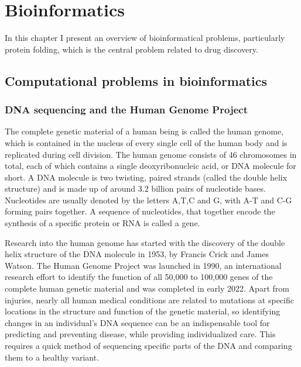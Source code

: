 \chapter{Bioinformatics}

In this chapter I present an overview of bioinformatical problems, particularly protein folding, which is the central problem related to drug discovery.\cite{BockenhauerAlgoBioinfo}

\section{Computational problems in bioinformatics}

\subsection{DNA sequencing and the Human Genome Project}

The complete genetic material of a human being is called the human genome, which is contained in the nucleus of every single cell of the human body and is replicated during cell division. The human genome consists of 46 chromosomes in total, each of which contains a single deoxyribonucleic acid, or DNA molecule for short. A DNA molecule is two twisting, paired strands (called the double helix structure) and is made up of around 3.2 billion pairs of nucleotide bases. Nucleotides are usually denoted by the letters A,T,C and G, with A-T and C-G forming pairs together. A sequence of nucleotides, that together encode the synthesis of a specific protein or RNA is called a gene.

Research into the human genome has started with the discovery of the double helix structure of the DNA molecule in 1953, by Francis Crick and James Watson. The Human Genome Project\cite{CollinsHumanGenome1995} was launched in 1990, an international research effort to identify the function of all 50,000 to 100,000 genes of the complete human genetic material and was completed in early 2022\cite{zahn_filling_2022}. Apart from injuries, nearly all human medical conditions are related to mutations at specific locations in the structure and function of the genetic material, so identifying changes in an individual's DNA sequence can be an indispensable tool for predicting and preventing disease, while providing individualized care. This requires a quick method of sequencing specific parts of the DNA and comparing them to a healthy variant.

